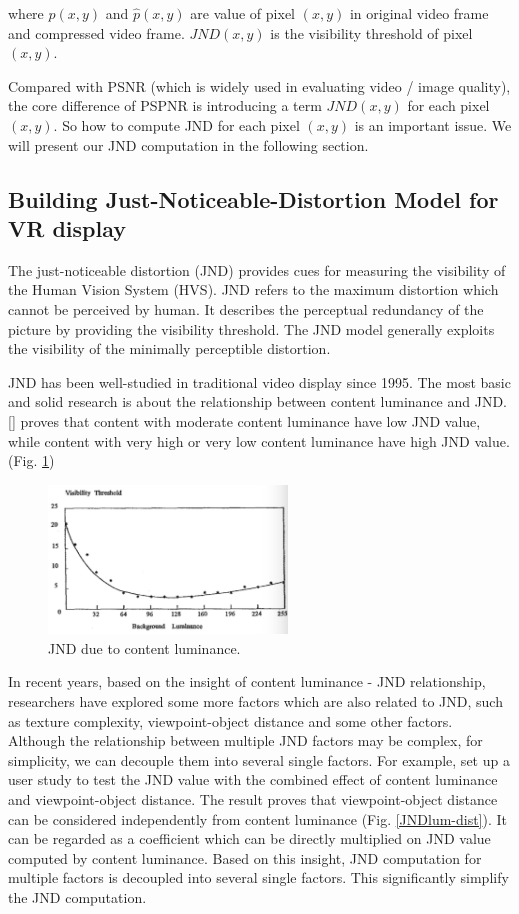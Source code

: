 where $p(x, y)$ and $\hat{p}(x, y)$ are value of pixel $(x, y)$ in original video frame and compressed video frame. $JND(x, y)$ is the visibility threshold of pixel $(x, y)$.

Compared with PSNR (which is widely used in evaluating video / image quality), the core difference of PSPNR is introducing a term $JND(x, y)$ for each pixel $(x, y)$. So how to compute JND for each pixel $(x, y)$ is an important issue. We will present our JND computation in the following section.

\subsection{Building Just-Noticeable-Distortion Model for VR display}
The just-noticeable distortion (JND) provides cues for measuring the visibility of the Human Vision System (HVS). JND refers to the maximum distortion which cannot be perceived by human. It describes the perceptual redundancy of the picture by providing the visibility threshold. The JND model generally exploits the visibility of the minimally perceptible distortion.

JND has been well-studied in traditional video display since 1995. The most basic and solid research is about the relationship between content luminance and JND. [] proves that content with moderate content luminance have low JND value, while content with very high or very low content luminance have high JND value. (Fig. \ref{JNDluminance})

\begin{figure}
  \centering
  \includegraphics[width=2.5in]{images/backgroundluminance.jpg}
  \caption{JND due to content luminance.}
  \label{JNDluminance}
  \end{figure}

In recent years, based on the insight of content luminance - JND relationship, researchers have explored some more factors which are also related to JND, such as texture complexity, viewpoint-object distance and some other factors. Although the relationship between multiple JND factors may be complex, for simplicity, we can decouple them into several single factors. For example, \cite{distance} set up a user study to test the JND value with the combined effect of content luminance and viewpoint-object distance. The result proves that viewpoint-object distance can be considered independently from content luminance (Fig. \ref{JNDlum-dist}). It can be regarded as a coefficient which can be directly multiplied on JND value computed by content luminance. Based on this insight, JND computation for multiple factors is decoupled into several single factors. This significantly simplify the JND computation.

